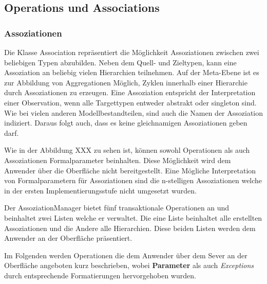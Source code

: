 \subsection{Operations und Associations}

\subsubsection{Assoziationen}

Die Klasse Association repräsentiert die Möglichkeit Assoziationen zwischen zwei beliebigen Typen abzubilden.
Neben dem Quell- und Zieltypen, kann eine Assoziation an beliebig vielen Hierarchien teilnehmen.
Auf der Meta-Ebene ist es zur Abbildung von Aggregationen Möglich, Zyklen innerhalb einer Hierarchie durch Assoziationen zu erzeugen.
Eine Assoziation entspricht der Interpretation einer Observation, wenn alle Targettypen entweder abstrakt oder singleton sind.
Wie bei vielen anderen Modellbestandteilen, sind auch die Namen der Assoziation indiziert. Daraus folgt auch, dass es keine gleichnamigen 
Assoziationen geben darf.

Wie in der Abbildung XXX zu sehen ist, können sowohl Operationen als auch Assoziationen Formalparameter beinhalten. Diese Möglichkeit wird
dem Anwender über die Oberfläche nicht bereitgestellt. Eine Mögliche Interpretation von Formalparametern für Assoziationen sind die n-stelligen Assoziationen
welche in der ersten Implementierungsstufe nicht umgesetzt wurden.

Der AssoziationManager bietet fünf transaktionale Operationen an und beinhaltet zwei Listen welche er verwaltet.
Die eine Liste beinhaltet alle erstellten Assoziationen und die Andere alle Hierarchien. Diese beiden Listen werden dem Anwender an der 
Oberfläche präsentiert.

Im Folgenden werden Operationen die dem Anwender über dem Sever an der Oberfläche angeboten kurz beschrieben, wobei
\textbf{Parameter} als auch \emph{Exceptions} durch entsprechende Formatierungen hervorgehoben wurden.

